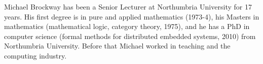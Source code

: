 \documentclass{ieeeaccess}
\begin{document}
\begin{IEEEbiography}{Michael Brockway}
has been a Senior Lecturer at Northumbria University for 17 years. His first degree is in pure and applied mathematics (1973-4), his Masters in mathematics (mathematical logic, category theory, 1975), and he has a PhD in computer science (formal methods for distributed embedded systems, 2010) from Northumbria University. Before that Michael worked in teaching and the computing industry.
\end{IEEEbiography}

\EOD
\end{document}
